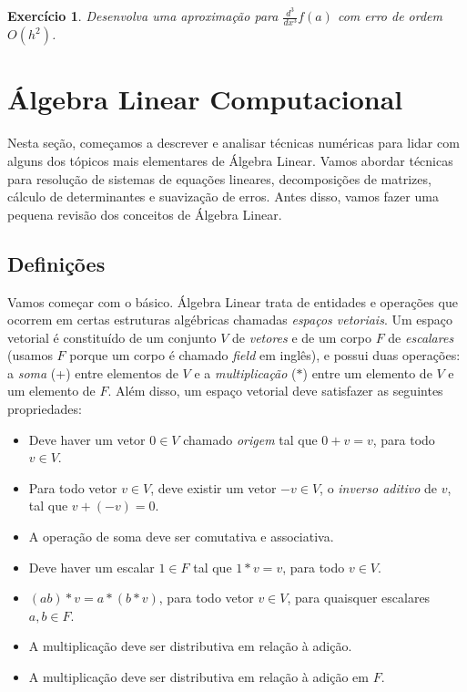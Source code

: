 \documentclass[]{article}
\newtheorem{exercicio}{Exercício}
\numberwithin{equation}{section}
\begin{document}
\begin{exercicio}
	Desenvolva uma aproximação para $\frac{d^3}{dx^3} f(a)$ com erro de ordem $O(h^2)$.
\end{exercicio}

\section{Álgebra Linear Computacional}

Nesta seção, começamos a descrever e analisar técnicas numéricas para lidar com alguns dos tópicos mais elementares de Álgebra Linear. Vamos abordar técnicas para resolução de sistemas de equações lineares, decomposições de matrizes, cálculo de determinantes e suavização de erros. Antes disso, vamos fazer uma pequena revisão dos conceitos de Álgebra Linear.

\subsection{Definições}

Vamos começar com o básico. Álgebra Linear trata de entidades e operações que ocorrem em certas estruturas algébricas chamadas \emph{espaços vetoriais}. Um espaço vetorial é constituído de um conjunto $V$ de \emph{vetores} e de um corpo $F$ de \emph{escalares} (usamos $F$ porque um corpo é chamado \emph{field} em inglês), e possui duas operações: a \emph{soma} (+) entre elementos de $V$ e a \emph{multiplicação} ($*$) entre um elemento de $V$ e um elemento de $F$. Além disso, um espaço vetorial deve satisfazer as seguintes propriedades:
\begin{itemize}
	\item
		Deve haver um vetor $0 \in V$ chamado \emph{origem} tal que $0 + v = v$, para todo $v \in V$.
	\item
		Para todo vetor $v \in V$, deve existir um vetor $-v \in V$, o \emph{inverso aditivo} de $v$, tal que $v + (-v) = 0$.
	\item
		A operação de soma deve ser comutativa e associativa.
	\item
		Deve haver um escalar $1 \in F$ tal que $1 * v = v$, para todo $v \in V$.
	\item
		$(ab)*v = a*(b*v)$, para todo vetor $v \in V$, para quaisquer escalares $a, b \in F$.
	\item
		A multiplicação deve ser distributiva em relação à adição.
	\item
		A multiplicação deve ser distributiva em relação à adição em $F$.
\end{itemize}
\end{document}
